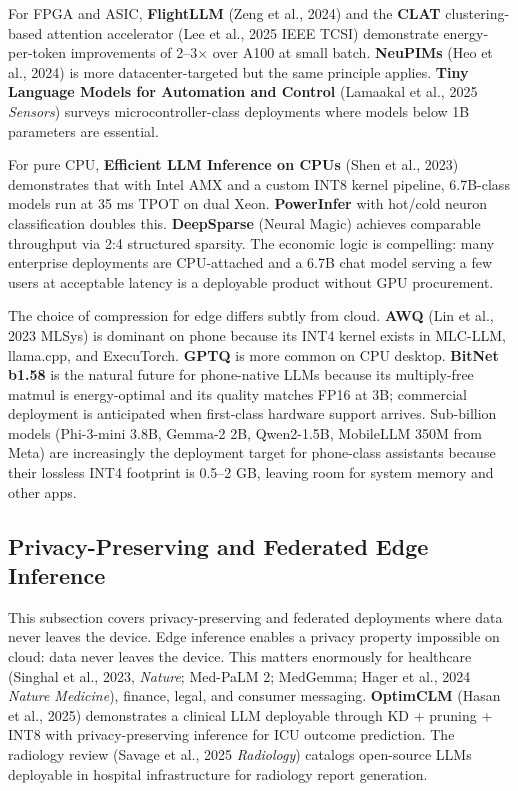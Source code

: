 For FPGA and ASIC, \textbf{FlightLLM} (Zeng et al., 2024) and the \textbf{CLAT} clustering-based attention accelerator (Lee et al., 2025 IEEE TCSI) demonstrate energy-per-token improvements of 2--3× over A100 at small batch. \textbf{NeuPIMs} (Heo et al., 2024) is more datacenter-targeted but the same principle applies. \textbf{Tiny Language Models for Automation and Control} (Lamaakal et al., 2025 \emph{Sensors}) surveys microcontroller-class deployments where models below 1B parameters are essential.

For pure CPU, \textbf{Efficient LLM Inference on CPUs} (Shen et al., 2023) demonstrates that with Intel AMX and a custom INT8 kernel pipeline, 6.7B-class models run at 35 ms TPOT on dual Xeon. \textbf{PowerInfer} with hot/cold neuron classification doubles this. \textbf{DeepSparse} (Neural Magic) achieves comparable throughput via 2:4 structured sparsity. The economic logic is compelling: many enterprise deployments are CPU-attached and a 6.7B chat model serving a few users at acceptable latency is a deployable product without GPU procurement.

The choice of compression for edge differs subtly from cloud. \textbf{AWQ} (Lin et al., 2023 MLSys) is dominant on phone because its INT4 kernel exists in MLC-LLM, llama.cpp, and ExecuTorch. \textbf{GPTQ} is more common on CPU desktop. \textbf{BitNet b1.58} is the natural future for phone-native LLMs because its multiply-free matmul is energy-optimal and its quality matches FP16 at 3B; commercial deployment is anticipated when first-class hardware support arrives. Sub-billion models (Phi-3-mini 3.8B, Gemma-2 2B, Qwen2-1.5B, MobileLLM 350M from Meta) are increasingly the deployment target for phone-class assistants because their lossless INT4 footprint is 0.5--2 GB, leaving room for system memory and other apps.

\subsection{Privacy-Preserving and Federated Edge Inference}\label{privacy-preserving-and-federated-edge-inference}

This subsection covers privacy-preserving and federated deployments where data never leaves the device. Edge inference enables a privacy property impossible on cloud: data never leaves the device. This matters enormously for healthcare (Singhal et al., 2023, \emph{Nature}; Med-PaLM 2; MedGemma; Hager et al., 2024 \emph{Nature Medicine}), finance, legal, and consumer messaging. \textbf{OptimCLM} (Hasan et al., 2025) demonstrates a clinical LLM deployable through KD + pruning + INT8 with privacy-preserving inference for ICU outcome prediction. The radiology review (Savage et al., 2025 \emph{Radiology}) catalogs open-source LLMs deployable in hospital infrastructure for radiology report generation.

